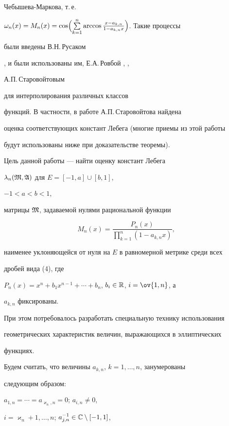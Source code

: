 Чебышева-Маркова, т.\,е.


$\omega_n(x)=M_n(x)=\cos\Bigl(\sum\limits^n_{k=1}\arccos


\frac{x-a_{k,n}}{1-a_{k,n}x}\Bigr)$. Такие процессы


были введены В.Н.\,Русаком


\cite{5}, и были использованы им, Е.А.\,Ровбой \cite{6}, \cite{7},


А.П.\,Старовойтовым


\cite{8} для интерполирования различных классов


функций. В частности, в работе А.П.\,Старовойтова \cite{8} найдена


оценка соответствующих констант Лебега (многие приемы из этой работы


будут использованы ниже при доказательстве теоремы).





Цель данной работы --- найти оценку констант Лебега


$\lambda_n(\frak M,\frak A)$ для $E=[-1,a]\cup[b,1]$,


$-1<a<b<1$,


матрицы $\frak M$, задаваемой нулями рациональной функции


\begin{equation}


M_n(x)=\frac{P_n(x)}{\prod\limits^n_{k=1}(1-a_{k,n}x)},


\end{equation}


наименее уклоняющейся от нуля на $E$ в равномерной метрике среди всех


дробей вида (4), где


$P_n(x)=x^n+b_1x^{n-1}+\dotsb+b_n$, $b_i\in\Bbb R$, $i=\ov{1,n}$, а


$a_{k,n}$ фиксированы.


При этом потребовалось разработать специальную технику использования


геометрических характеристик величин, выражающихся в эллиптических


функциях.





Будем считать, что величины $a_{k,n}$, $k=1,\dotsc,n$, занумерованы


следующим образом:


$a_{1,n}=\dotsb=a_{\varkappa_n,n}=0$; $a_{i,n}\ne 0$,


$i=\varkappa_n+1,\dotsc,n$; $a^{-1}_{j,n}\in\Bbb C\setminus[-1,1]$,


